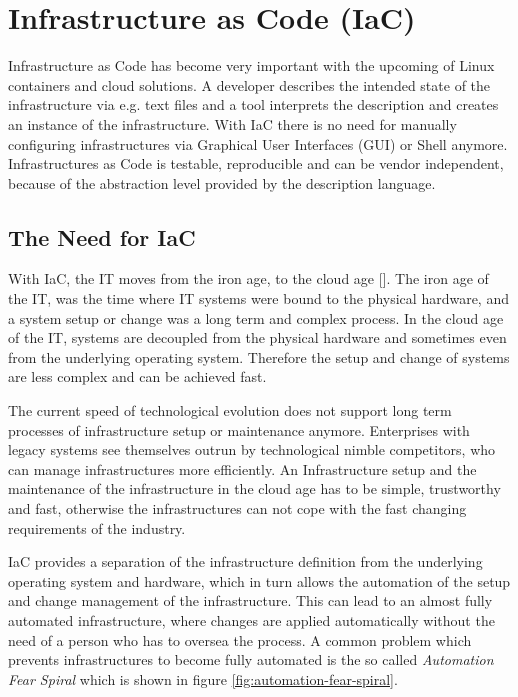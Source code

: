 \chapter{Infrastructure as Code (IaC)}
\label{cha:iac}
Infrastructure as Code has become very important with the upcoming of Linux containers and cloud solutions. A developer describes the intended state of the infrastructure via e.g. text files and a tool interprets the description and creates an instance of the infrastructure. With IaC there is no need for manually configuring infrastructures via Graphical User Interfaces (GUI) or Shell anymore. Infrastructures as Code is testable, reproducible and can be vendor independent, because of the abstraction level provided by the description language. 

\section{The Need for IaC}
\label{sec:iac-need}
With IaC, the IT moves from the iron age, to the cloud age [\cite[p. 4]{Morris2017}]. The iron age of the IT, was the time where IT systems were bound to the physical hardware, and a system setup or change was a long term and complex process. In the cloud age of the IT, systems are decoupled from the physical hardware and sometimes even from the underlying operating system. Therefore the setup and change of systems are less complex and can be achieved fast.

The current speed of technological evolution does not support long term processes of infrastructure setup or maintenance anymore. Enterprises with legacy systems see themselves outrun by technological nimble competitors, who can manage infrastructures more efficiently. An Infrastructure setup and the maintenance of the infrastructure in the cloud age has to be simple, trustworthy and fast, otherwise the infrastructures can not cope with the fast changing requirements of the industry.

IaC provides a separation of the infrastructure definition from the underlying operating system and hardware, which in turn allows the automation of the setup and change management of the infrastructure. This can lead to an almost fully automated infrastructure, where changes are applied automatically without the need of a person who has to oversea the process. A common problem which prevents infrastructures to become fully automated is the so called \emph{Automation Fear Spiral} which is shown in figure \ref{fig:automation-fear-spiral}.
\newpage

